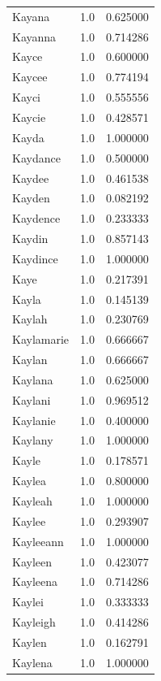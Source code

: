 \documentclass[
  letterpaper,
  DIV=11,
  numbers=noendperiod]{scrreprt}
\begin{document}
\begin{tabular}{lrr}
Kayana          &   1.0 &   0.625000 \\
Kayanna         &   1.0 &   0.714286 \\
Kayce           &   1.0 &   0.600000 \\
Kaycee          &   1.0 &   0.774194 \\
Kayci           &   1.0 &   0.555556 \\
Kaycie          &   1.0 &   0.428571 \\
Kayda           &   1.0 &   1.000000 \\
Kaydance        &   1.0 &   0.500000 \\
Kaydee          &   1.0 &   0.461538 \\
Kayden          &   1.0 &   0.082192 \\
Kaydence        &   1.0 &   0.233333 \\
Kaydin          &   1.0 &   0.857143 \\
Kaydince        &   1.0 &   1.000000 \\
Kaye            &   1.0 &   0.217391 \\
Kayla           &   1.0 &   0.145139 \\
Kaylah          &   1.0 &   0.230769 \\
Kaylamarie      &   1.0 &   0.666667 \\
Kaylan          &   1.0 &   0.666667 \\
Kaylana         &   1.0 &   0.625000 \\
Kaylani         &   1.0 &   0.969512 \\
Kaylanie        &   1.0 &   0.400000 \\
Kaylany         &   1.0 &   1.000000 \\
Kayle           &   1.0 &   0.178571 \\
Kaylea          &   1.0 &   0.800000 \\
Kayleah         &   1.0 &   1.000000 \\
Kaylee          &   1.0 &   0.293907 \\
Kayleeann       &   1.0 &   1.000000 \\
Kayleen         &   1.0 &   0.423077 \\
Kayleena        &   1.0 &   0.714286 \\
Kaylei          &   1.0 &   0.333333 \\
Kayleigh        &   1.0 &   0.414286 \\
Kaylen          &   1.0 &   0.162791 \\
Kaylena         &   1.0 &   1.000000 \\

\end{tabular}
\end{document}
